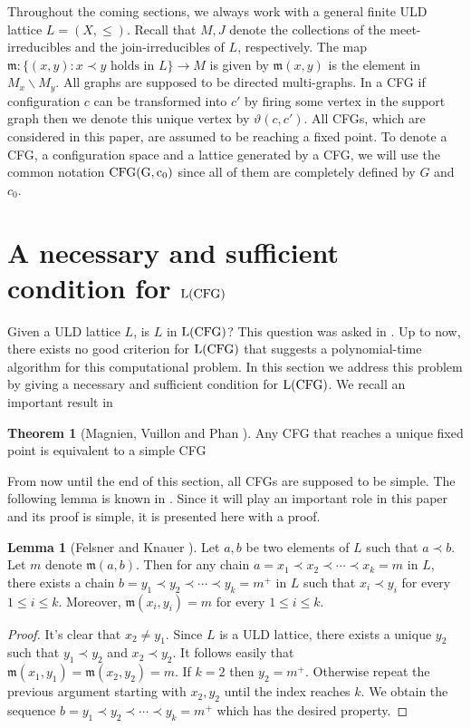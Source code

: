 \documentclass{article}
\theoremstyle{definition}
\newtheorem{lem}{Lemma}
\newtheorem{theo}{Theorem}
\newcommand\successor[1]{{#1}^{+}}
\newcommand\set[1]{\{ #1 \}}
\newcommand\labelmap[1]{\mathfrak{m}(#1)}
\begin{document}
Throughout the coming sections, we always work with a general finite ULD lattice $L=(X,\leq)$. Recall that $M,J$ denote the collections of the meet-irreducibles and the join-irreducibles of $L$, respectively. The map $\mathfrak{m}:\set{(x,y): x \prec y \text{ holds in } L}\to M$ is given by $\mathfrak{m}(x,y)$ is the element in $M_x\backslash M_y$. All graphs are supposed to be directed multi-graphs. In a CFG if configuration $c$ can be transformed into $c'$ by firing some vertex in the support graph then we denote this unique vertex by $\vartheta(c,c')$. All CFGs, which are considered in this paper, are assumed to be reaching a fixed point. To denote a CFG, a configuration space and a lattice generated by a CFG, we will use the common notation ${\rm CFG(G,c_0)}$ since all of them are completely defined by $G$ and $c_0$.
\section{A necessary and sufficient condition for ${\rm L(CFG)}$}
\label{third section}
Given a ULD lattice $L$, is $L$ in ${\rm L(CFG)}$? This question was asked in \cite{MVP01}. Up to now, there exists no good criterion for  ${\rm L(CFG)}$ that suggests a polynomial-time algorithm for this computational problem. In this section we address this problem by giving a necessary and sufficient condition for ${\rm L(CFG)}$. We recall an important result in \cite{MVP01}
\begin{theo}[Magnien, Vuillon and Phan \cite{MVP01}]
\label{theorem of simple CFG}
Any CFG that reaches a unique fixed point is equivalent to a simple CFG
\end{theo}
From now until the end of this section, all CFGs are supposed to be simple. The following lemma is known in \cite{FK09}. Since it will play an important role in this paper and its proof is simple, it is presented here with a proof.
\begin{lem}[Felsner and Knauer \cite{FK09}]
\label{lemma of the square connection}
Let $a,b$ be two elements of $L$ such that $a \prec b$. Let $m$ denote $\mathfrak{m}(a,b)$. Then for any chain $a=x_1 \prec x_2 \prec \cdots \prec x_k=m$ in $L$, there exists a chain $b=y_1 \prec y_2 \prec \cdots \prec y_k=\successor{m}$ in $L$ such that $x_i \prec y_i$ for every $1\leq i \leq k$. Moreover, $\mathfrak{m}(x_i,y_i)=m$  for every $1\leq i\leq k$. 
\end{lem}
\begin{proof}
It's clear that $x_2 \neq y_1$. Since $L$ is a ULD lattice, there exists a unique $y_2$ such that $y_1 \prec y_2$ and $x_2 \prec y_2$. It follows easily that $\labelmap{x_1,y_1}=\labelmap{x_2,y_2}=m$. If $k=2$ then $y_2=\successor{m}$. Otherwise  repeat the previous argument starting with $x_2,y_2$ until the index reaches $k$. We obtain the sequence $b=y_1 \prec y_2 \prec \cdots \prec y_k=\successor{m}$ which has the desired property.
\end{proof}
\end{document}
